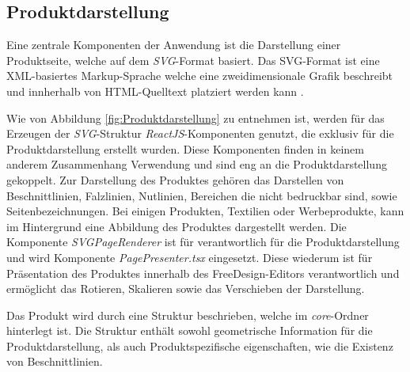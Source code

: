 \subsection{Produktdarstellung}
Eine zentrale Komponenten der Anwendung ist die Darstellung einer Produktseite, welche auf dem \textit{SVG}-Format basiert.
Das SVG-Format ist eine XML-basiertes Markup-Sprache welche eine zweidimensionale Grafik beschreibt und innherhalb von HTML-Quelltext platziert werden kann \autocite[vgl.][]{AboutSVG}. 

Wie von Abbildung \ref{fig:Produktdarstellung} zu entnehmen ist, werden für das Erzeugen der \textit{SVG}-Struktur \textit{ReactJS}-Komponenten genutzt, die exklusiv für die Produktdarstellung erstellt wurden. Diese Komponenten finden in keinem anderem Zusammenhang Verwendung und sind eng an die Produktdarstellung gekoppelt. 
Zur Darstellung des Produktes gehören das Darstellen von Beschnittlinien, Falzlinien, Nutlinien, Bereichen die nicht bedruckbar sind, sowie Seitenbezeichnungen. Bei einigen Produkten, Textilien oder Werbeprodukte, kann im Hintergrund eine Abbildung des Produktes dargestellt werden. Die Komponente \textit{SVGPageRenderer} ist für verantwortlich für die Produktdarstellung und wird Komponente \textit{PagePresenter.tsx} eingesetzt. Diese wiederum ist für Präsentation des Produktes innerhalb des FreeDesign-Editors verantwortlich und ermöglicht das Rotieren, Skalieren sowie das Verschieben der Darstellung. 


Das Produkt wird durch eine Struktur beschrieben, welche im \textit{core}-Ordner hinterlegt ist. Die Struktur enthält sowohl geometrische Information für die Produktdarstellung, als auch Produktspezifische eigenschaften, wie die Existenz von Beschnittlinien. 

